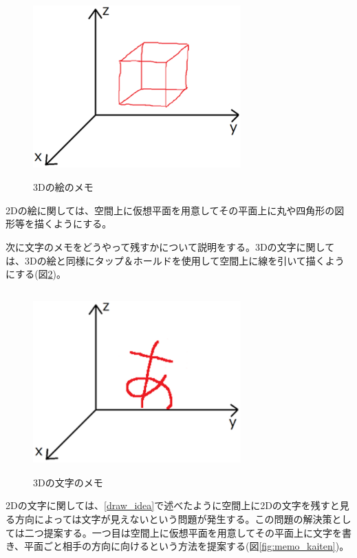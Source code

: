 \documentclass[11pt,a4j, titlepage]{jarticle} %
\begin{document}
\begin{figure}[H]
  \begin{center}
    \includegraphics[clip,height=7.0cm,width=8.0cm]{./3d_draw.eps}
    \caption{3Dの絵のメモ}
    \label{fig:3d_draw}
  \end{center}
\end{figure}

2Dの絵に関しては、空間上に仮想平面を用意してその平面上に丸や四角形の図形等を描くようにする。

次に文字のメモをどうやって残すかについて説明をする。3Dの文字に関しては、3Dの絵と同様にタップ＆ホールドを使用して空間上に線を引いて描くようにする(図\ref{fig:3d_moji})。

\begin{figure}[H]
  \begin{center}
    \includegraphics[clip,height=7.0cm,width=8.0cm]{./3d_moji.eps}
    \caption{3Dの文字のメモ}
    \label{fig:3d_moji}
  \end{center}
\end{figure}

2Dの文字に関しては、\ref{draw_idea}で述べたように空間上に2Dの文字を残すと見る方向によっては文字が見えないという問題が発生する。この問題の解決策としては二つ提案する。一つ目は空間上に仮想平面を用意してその平面上に文字を書き、平面ごと相手の方向に向けるという方法を提案する(図\ref{fig:memo_kaiten})。
\end{document}
